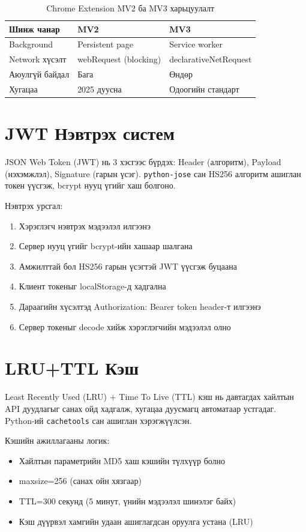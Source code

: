 \documentclass[12pt,a4paper]{report}
\begin{document}
\begin{table}[H]
\centering
\caption{Chrome Extension MV2 ба MV3 харьцуулалт}
\label{tab:mv2_mv3}
\begin{tabularx}{\textwidth}{@{}lXX@{}}
\toprule
\textbf{Шинж чанар} & \textbf{MV2} & \textbf{MV3} \\
\midrule
Background & Persistent page & Service worker \\
Network хүсэлт & webRequest (blocking) & declarativeNetRequest \\
Аюулгүй байдал & Бага & Өндөр \\
Хугацаа & 2025 дуусна & Одоогийн стандарт \\
\bottomrule
\end{tabularx}
\end{table}

\section{JWT Нэвтрэх систем}

JSON Web Token (JWT) \cite{jwt} нь 3 хэсгээс бүрдэх: Header (алгоритм), Payload (нэхэмжлэл), Signature (гарын үсэг). \texttt{python-jose} сан HS256 алгоритм ашиглан токен үүсгэж, bcrypt нууц үгийг хаш болгоно.

Нэвтрэх урсгал:
\begin{enumerate}[leftmargin=1.5cm]
  \item Хэрэглэгч нэвтрэх мэдээлэл илгээнэ
  \item Сервер нууц үгийг bcrypt-ийн хашаар шалгана
  \item Амжилттай бол HS256 гарын үсэгтэй JWT үүсгэж буцаана
  \item Клиент токеныг localStorage-д хадгална
  \item Дараагийн хүсэлтэд Authorization: Bearer {token} header-т илгээнэ
  \item Сервер токеныг decode хийж хэрэглэгчийн мэдээлэл олно
\end{enumerate}

\section{LRU+TTL Кэш}

Least Recently Used (LRU) + Time To Live (TTL) кэш нь давтагдах хайлтын API дуудлагыг санах ойд хадгалж, хугацаа дуусмагц автоматаар устгадаг. Python-ий \texttt{cachetools} сан ашиглан хэрэгжүүлсэн.

Кэшийн ажиллагааны логик:
\begin{itemize}[leftmargin=1.5cm]
  \item Хайлтын параметрийн MD5 хаш кэшийн түлхүүр болно
  \item maxsize=256 (санах ойн хязгаар)
  \item TTL=300 секунд (5 минут, үнийн мэдээлэл шинэлэг байх)
  \item Кэш дүүрвэл хамгийн удаан ашиглагдсан оруулга устана (LRU)
\end{itemize}
\end{document}
